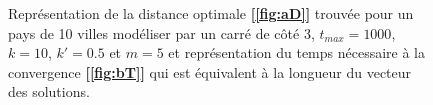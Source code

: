 \documentclass[12pt]{article}
\begin{document}
\begin{figure}[H]

  \caption{Représentation de la distance optimale \textbf{[\ref{fig:aD}]}  trouvée pour un pays de 10  villes modéliser par un carré de côté 3, $t_{max}=1000$, $k=10$, $k'=0.5$ et $m=5$  et représentation du temps nécessaire à la convergence  \textbf{[\ref{fig:bT}]} qui est équivalent à  la longueur du vecteur des solutions.}
  \label{fig:ab}
\end{figure}



 
\end{document}
